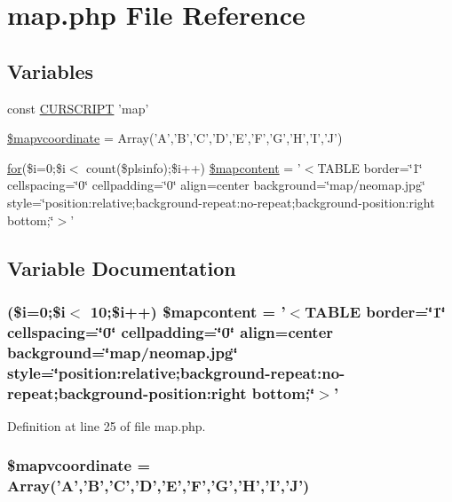 \hypertarget{map_8php}{\section{map.\+php File Reference}
\label{map_8php}
}
\subsection*{Variables}
\begin{DoxyCompactItemize}
\item 
const \hyperlink{map_8php_a39c39f525eceb86cabc338804f230e80}{C\+U\+R\+S\+C\+R\+I\+P\+T} 'map'
\item 
\hyperlink{map_8php_a593018bd2a8f877c2662c883139a4559}{\$mapvcoordinate} = Array('A','B','C','D','E','F','G','H','I','J')
\item 
\hyperlink{winner_8php_a2059cdc4b75f7f57f2eadd00aaa9ffbe}{for}(\$i=0;\$i$<$ count(\$plsinfo);\$i++) \hyperlink{map_8php_a57643526f7d893d8ea2158104851db56}{\$mapcontent} = '$<$T\+A\+B\+L\+E border=\char`\"{}1\char`\"{} cellspacing=\char`\"{}0\char`\"{} cellpadding=\char`\"{}0\char`\"{} align=center background=\char`\"{}map/neomap.\+jpg\char`\"{} style=\char`\"{}position\+:relative;background-\/repeat\+:no-\/repeat;background-\/position\+:right bottom;\char`\"{}$>$'
\end{DoxyCompactItemize}


\subsection{Variable Documentation}
\hypertarget{map_8php_a57643526f7d893d8ea2158104851db56}{
\subsubsection[{\$mapcontent}]{ (\$i=0;\$i$<$ 10;\$i++) \$mapcontent = '$<$T\+A\+B\+L\+E border=\char`\"{}1\char`\"{} cellspacing=\char`\"{}0\char`\"{} cellpadding=\char`\"{}0\char`\"{} align=center background=\char`\"{}map/neomap.\+jpg\char`\"{} style=\char`\"{}position\+:relative;background-\/repeat\+:no-\/repeat;background-\/position\+:right bottom;\char`\"{}$>$'}}\label{map_8php_a57643526f7d893d8ea2158104851db56}


Definition at line 25 of file map.\+php.

\hypertarget{map_8php_a593018bd2a8f877c2662c883139a4559}{
\subsubsection[{\$mapvcoordinate}]{\setlength{\rightskip}{0pt plus 5cm}\$mapvcoordinate = Array('A','B','C','D','E','F','G','H','I','J')}}\label{map_8php_a593018bd2a8f877c2662c883139a4559}


